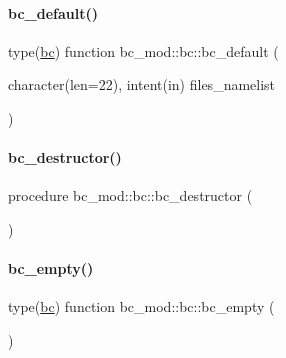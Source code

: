 \mbox{\label{structbc__mod_1_1bc_a740cece69077685b30af7e619d448b33}} 
\paragraph{\texorpdfstring{bc\+\_\+default()}{bc\_default()}}
{\footnotesize\ttfamily type(\mbox{\hyperlink{structbc__mod_1_1bc}{bc}}) function bc\+\_\+mod\+::bc\+::bc\+\_\+default (\begin{DoxyParamCaption}\item[{character(len=22), intent(in)}]{files\+\_\+namelist }\end{DoxyParamCaption})\hspace{0.3cm}{\ttfamily [private]}}

\mbox{\label{structbc__mod_1_1bc_ad38c12a9f905c66965ffe633ead4edd2}} 
\paragraph{\texorpdfstring{bc\+\_\+destructor()}{bc\_destructor()}}
{\footnotesize\ttfamily procedure bc\+\_\+mod\+::bc\+::bc\+\_\+destructor (\begin{DoxyParamCaption}{ }\end{DoxyParamCaption})\hspace{0.3cm}{\ttfamily [private]}}

\mbox{\label{structbc__mod_1_1bc_a721ce450ae1ffdc8c9f0c8ef12f045d1}} 
\paragraph{\texorpdfstring{bc\+\_\+empty()}{bc\_empty()}}
{\footnotesize\ttfamily type(\mbox{\hyperlink{structbc__mod_1_1bc}{bc}}) function bc\+\_\+mod\+::bc\+::bc\+\_\+empty (\begin{DoxyParamCaption}{ }\end{DoxyParamCaption})\hspace{0.3cm}{\ttfamily [private]}}

